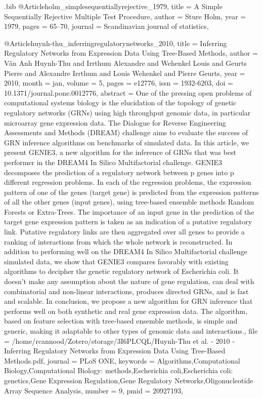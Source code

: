 \documentclass[
  table,
  10pt,
  a4paper]{article}
\begin{document}
\begin{filecontents}{\jobname.bib}
@Article{holm_simplesequentiallyrejective_1979,
	title = {A Simple Sequentially Rejective Multiple Test Procedure},
	author = {Sture Holm},
	year = {1979},
	pages = {65--70},
	journal = {Scandinavian journal of statistics},
}

@Article{huynh-thu_inferringregulatorynetworks_2010,
	title = {Inferring {{Regulatory Networks}} from {{Expression Data Using Tree}}-{{Based Methods}}},
	author = {V{\^a}n Anh Huynh-Thu and Irrthum Alexandre and Wehenkel Louis and Geurts Pierre and Alexandre Irrthum and Louis Wehenkel and Pierre Geurts},
	year = {2010},
	month = {jan},
	volume = {5},
	pages = {e12776},
	issn = {1932-6203},
	doi = {10.1371/journal.pone.0012776},
	abstract = {One of the pressing open problems of computational systems biology is the elucidation of the topology of genetic regulatory networks (GRNs) using high throughput genomic data, in particular microarray gene expression data. The Dialogue for Reverse Engineering Assessments and Methods (DREAM) challenge aims to evaluate the success of GRN inference algorithms on benchmarks of simulated data. In this article, we present GENIE3, a new algorithm for the inference of GRNs that was best performer in the DREAM4 In Silico Multifactorial challenge. GENIE3 decomposes the prediction of a regulatory network between p genes into p different regression problems. In each of the regression problems, the expression pattern of one of the genes (target gene) is predicted from the expression patterns of all the other genes (input genes), using tree-based ensemble methods Random Forests or Extra-Trees. The importance of an input gene in the prediction of the target gene expression pattern is taken as an indication of a putative regulatory link. Putative regulatory links are then aggregated over all genes to provide a ranking of interactions from which the whole network is reconstructed. In addition to performing well on the DREAM4 In Silico Multifactorial challenge simulated data, we show that GENIE3 compares favorably with existing algorithms to decipher the genetic regulatory network of Escherichia coli. It doesn't make any assumption about the nature of gene regulation, can deal with combinatorial and non-linear interactions, produces directed GRNs, and is fast and scalable. In conclusion, we propose a new algorithm for GRN inference that performs well on both synthetic and real gene expression data. The algorithm, based on feature selection with tree-based ensemble methods, is simple and generic, making it adaptable to other types of genomic data and interactions.},
	file = {/home/rcannood/Zotero/storage/3I6PLCQL/Huynh-Thu et al. - 2010 - Inferring Regulatory Networks from Expression Data Using Tree-Based Methods.pdf},
	journal = {PLoS ONE},
	keywords = {Algorithms,Computational Biology,Computational Biology: methods,Escherichia coli,Escherichia coli: genetics,Gene Expression Regulation,Gene Regulatory Networks,Oligonucleotide Array Sequence Analysis},
	number = {9},
	pmid = {20927193},
}


\end{filecontents}
\end{document}
